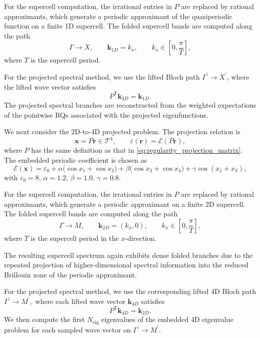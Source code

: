 \documentclass[11pt]{article}
\numberwithin{equation}{section}
\begin{document}
For the supercell computation, the irrational entries in $P$ are replaced by
rational approximants, which generate a periodic approximant of the
quasiperiodic function on a finite 1D supercell. The folded supercell bands are
computed along the path
$$
\Gamma\rightarrow X,
\qquad
\mathbf{k}_{1D}=k_x,
\qquad
k_x\in\left[0,\frac{\pi}{T}\right],
$$
where $T$ is the supercell period.

For the projected spectral method, we use the lifted Bloch path $\Gamma^{\prime}\rightarrow X^{\prime}$,  where the lifted wave vector satisfies
$$
P^{\mathsf T}\mathbf{k}_{2D} = \mathbf{k}_{1D}.
$$
The projected spectral branches are reconstructed from the weighted
expectations of the pointwise RQs associated with the projected eigenfunctions.

We next consider the 2D-to-4D projected problem. The projection relation is
$$
\mathbf{x}=P\mathbf{r}\in\mathcal{T}^{4},
\qquad
\varepsilon(\mathbf{r})=\mathcal{E}(P\mathbf{r}),
$$
where $P$ has the same definition as that in \eqref{eq:regularity_projection_matrix}. The embedded periodic coefficient is chosen as
\begin{equation}
\mathcal{E}(\mathbf{x}) =
\varepsilon_0 + \alpha\bigl(\cos x_1+\cos x_2\bigr) + \beta\bigl(\cos x_3+\cos x_4\bigr) + \gamma\cos(x_1+x_3),
\label{eq:band_unfolding_coefficient}
\end{equation}
with $\varepsilon_0=8, \, \alpha=1.2, \, \beta=1.0, \, \gamma=0.8.$

For the supercell computation, the irrational entries in $P$ are replaced by rational approximants, which generate a periodic approximant on a finite 2D supercell. The folded supercell bands are computed along the path
$$
\Gamma\rightarrow M,
\qquad
\mathbf{k}_{2D}=(k_x,0),
\qquad
k_x\in\left[0,\frac{\pi}{T}\right],
$$
where $T$ is the supercell period in the $x$-direction.

The resulting supercell spectrum again exhibits dense folded branches due to the repeated projection of higher-dimensional spectral information into the reduced Brillouin zone of the periodic approximant.

For the projected spectral method, we use the corresponding lifted 4D Bloch path $\Gamma^{\prime}\rightarrow M^{\prime},$ where each lifted wave vector $\mathbf{k}_{4D}$ satisfies
$$
P^{\mathsf T}\mathbf{k}_{4D} = \mathbf{k}_{2D}.
$$
We then compute the first $N_{\mathrm{eig}}$ eigenvalues of the embedded 4D
eigenvalue problem for each sampled wave vector on
$\Gamma^{\prime}\rightarrow M^{\prime}$.
\end{document}
